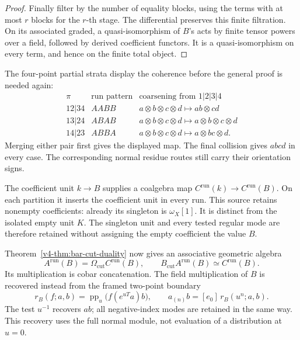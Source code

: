 \begin{proof}
Finally filter by the number of equality blocks, using
the terms with at most \(r\) blocks for the \(r\)-th
stage. The differential preserves this finite filtration.
On its associated graded, a quasi-isomorphism of \(B\)'s
acts by finite tensor powers over a field, followed by
derived coefficient functors. It is a quasi-isomorphism
on every term, and hence on the finite total object.
\end{proof}

The four-point partial strata display the coherence before
the general proof is needed again:
\[
 \begin{array}{c|c|c}
 \pi&\text{run pattern}&\text{coarsening from }1|2|3|4\\ \hline
 12|34&AABB& a\otimes b\otimes c\otimes d\mapsto ab\otimes cd\\
 13|24&ABAB& a\otimes b\otimes c\otimes d\mapsto a\otimes b\otimes c\otimes d\\
 14|23&ABBA& a\otimes b\otimes c\otimes d\mapsto a\otimes bc\otimes d.
 \end{array}
\]
Merging either pair first gives the displayed map.
The final collision gives \(abcd\) in every case.
The corresponding normal residue routes still carry
their orientation signs.

The coefficient unit \(k\to B\) supplies a coalgebra map
\(C^{\mathrm{run}}(k)\to C^{\mathrm{run}}(B)\).
On each partition it inserts the coefficient unit in
every run. This source retains nonempty coefficients:
already its singleton is \(\omega_X[1]\).
It is distinct from the isolated empty unit \(K\).
The singleton unit and every tested regular mode are
therefore retained without assigning the empty
coefficient the value \(B\).

Theorem~\ref{v4-thm:bar-cut-duality} now gives an associative
geometric algebra
\[
 A^{\mathrm{run}}(B)
      =\Omega_{\mathrm{cut}}C^{\mathrm{run}}(B),
 \qquad
 B_{\mathrm{cut}}A^{\mathrm{run}}(B)
      \simeq C^{\mathrm{run}}(B).
\]
Its multiplication is cobar concatenation. The field
multiplication of \(B\) is recovered instead from the
framed two-point boundary
\[
 r_B(f;a,b)=\operatorname{pp}_u\bigl(f(e^{uT}a)b\bigr),
 \qquad
 a_{(n)}b=[e_0]\,r_B(u^n;a,b).
\]
The test \(u^{-1}\) recovers \(ab\); all negative-index
modes are retained in the same way. This recovery uses
the full normal module, not evaluation of a distribution
at \(u=0\).

